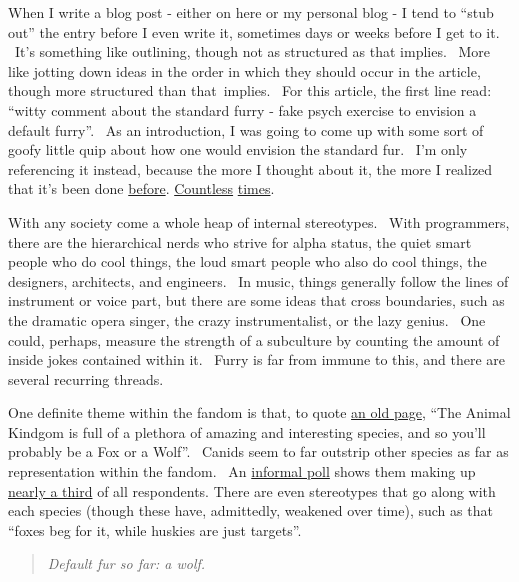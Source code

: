 When I write a blog post - either on here or my personal blog - I tend
to ``stub out'' the entry before I even write it, sometimes days or
weeks before I get to it. ~It's something like outlining, though not as
structured as that implies. ~More like jotting down ideas in the order
in which they should occur in the article, though more structured than
that~implies. ~For this article, the first line read: ``witty comment
about the standard furry - fake psych exercise to envision a default
furry''. ~As an introduction, I was going to come up with some sort of
goofy little quip about how one would envision the standard fur. ~I'm
only referencing it instead, because the more I thought about it, the
more I realized that it's been done
\href{http://www.youtube.com/watch?v=J_lYov60qow}{before}.
\href{http://us-p.vclart.net/vcl/Artists/Sean-O\%27Hare/Comics/LIFH_The_Furries.jpg}{Countless}
\href{http://en.wikifur.com/wiki/Horrifying_Look_at_the_Furries}{times}.

With any society come a whole heap of internal stereotypes. ~With
programmers, there are the hierarchical nerds who strive for alpha
status, the quiet smart people who do cool things, the loud smart people
who also do cool things, the designers, architects, and engineers. ~In
music, things generally follow the lines of instrument or voice part,
but there are some ideas that cross boundaries, such as the dramatic
opera singer, the crazy instrumentalist, or the lazy genius. ~One could,
perhaps, measure the strength of a subculture by counting the amount of
inside jokes contained within it. ~Furry is far from immune to this, and
there are several recurring threads.

One definite theme within the fandom is that, to quote
\href{http://rikoshi.gd-kun.net/furry.html}{an old page}, ``The Animal
Kindgom is full of a plethora of amazing and interesting species, and so
you'll probably be a Fox or a Wolf''. ~Canids seem to far outstrip other
species as far as representation within the fandom. ~An
\href{http://forums.furaffinity.net/threads/61671-Furs-By-Species-2}{informal
poll} shows them making up
\href{http://vis.adjectivespecies.com/furrysurvey/extras/species.shtml}{nearly
a third} of all respondents. There are even stereotypes that go along
with each species (though these have, admittedly, weakened over time),
such as that ``foxes beg for it, while huskies are just targets''.

\begin{quote}
\emph{Default fur so far: a wolf.}
\end{quote}

